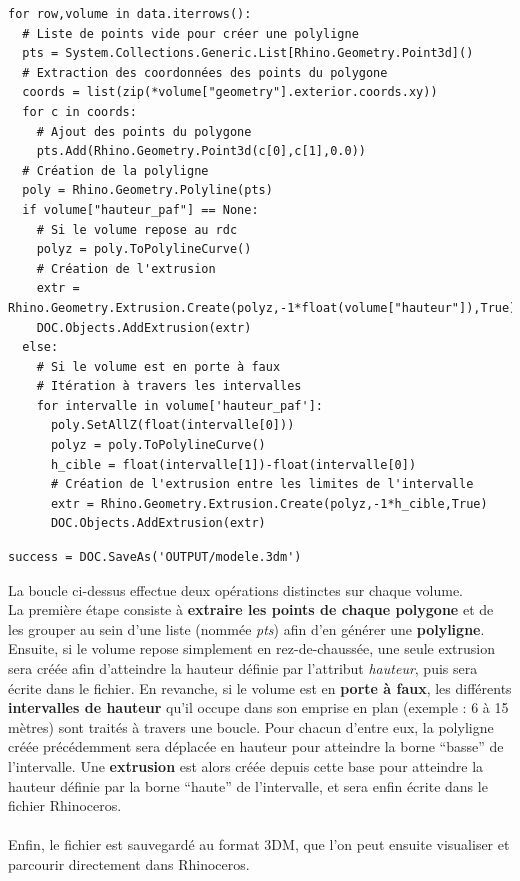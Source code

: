 \documentclass[
  11pt,
  french,
]{article}
\begin{document}
\begin{tcolorbox}[title= Fichier vectoriel organisé des emprises des volumes ,colback=boitecode]
\begin{lstlisting}[style=code]
for row,volume in data.iterrows():
  # Liste de points vide pour créer une polyligne
  pts = System.Collections.Generic.List[Rhino.Geometry.Point3d]()
  # Extraction des coordonnées des points du polygone
  coords = list(zip(*volume["geometry"].exterior.coords.xy))
  for c in coords:
    # Ajout des points du polygone
    pts.Add(Rhino.Geometry.Point3d(c[0],c[1],0.0))
  # Création de la polyligne
  poly = Rhino.Geometry.Polyline(pts)
  if volume["hauteur_paf"] == None:
    # Si le volume repose au rdc
    polyz = poly.ToPolylineCurve()
    # Création de l'extrusion
    extr = Rhino.Geometry.Extrusion.Create(polyz,-1*float(volume["hauteur"]),True)
    DOC.Objects.AddExtrusion(extr)
  else:
    # Si le volume est en porte à faux
    # Itération à travers les intervalles
    for intervalle in volume['hauteur_paf']:
      poly.SetAllZ(float(intervalle[0]))
      polyz = poly.ToPolylineCurve()
      h_cible = float(intervalle[1])-float(intervalle[0])
      # Création de l'extrusion entre les limites de l'intervalle
      extr = Rhino.Geometry.Extrusion.Create(polyz,-1*h_cible,True)
      DOC.Objects.AddExtrusion(extr)
  \end{lstlisting}
\begin{lstlisting}[style=code]
success = DOC.SaveAs('OUTPUT/modele.3dm')\end{lstlisting}
\end{tcolorbox}

La boucle ci-dessus effectue deux opérations distinctes sur chaque
volume.\\
La première étape consiste à \textbf{extraire les points de chaque
polygone} et de les grouper au sein d'une liste (nommée \emph{pts}) afin
d'en générer une \textbf{polyligne}.\\
Ensuite, si le volume repose simplement en rez-de-chaussée, une seule
extrusion sera créée afin d'atteindre la hauteur définie par l'attribut
\emph{hauteur}, puis sera écrite dans le fichier. En revanche, si le
volume est en \textbf{porte à faux}, les différents \textbf{intervalles
de hauteur} qu'il occupe dans son emprise en plan (exemple : 6 à 15
mètres) sont traités à travers une boucle. Pour chacun d'entre eux, la
polyligne créée précédemment sera déplacée en hauteur pour atteindre la
borne ``basse'' de l'intervalle. Une \textbf{extrusion} est alors créée
depuis cette base pour atteindre la hauteur définie par la borne
``haute'' de l'intervalle, et sera enfin écrite dans le fichier
Rhinoceros.\\
~\\
Enfin, le fichier est sauvegardé au format 3DM, que l'on peut ensuite
visualiser et parcourir directement dans Rhinoceros.
\end{document}
